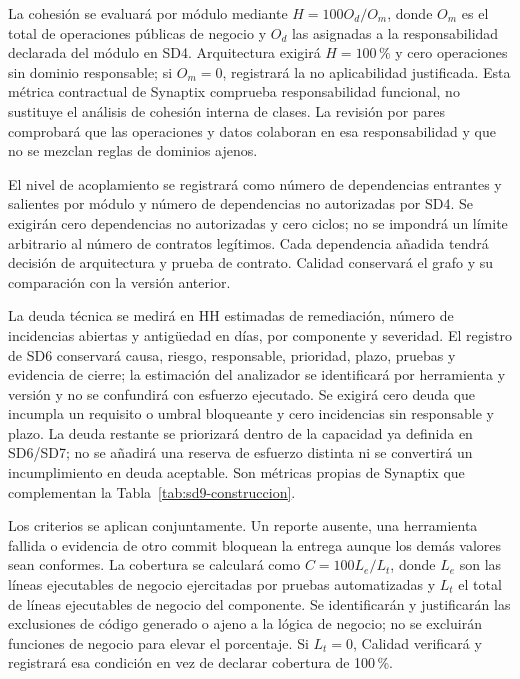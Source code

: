 La cohesión se evaluará por módulo mediante $H=100O_d/O_m$, donde $O_m$ es el total de operaciones públicas de negocio y $O_d$ las asignadas a la responsabilidad declarada del módulo en SD4. Arquitectura exigirá $H=100\,\%$ y cero operaciones sin dominio responsable; si $O_m=0$, registrará la no aplicabilidad justificada. Esta métrica contractual de Synaptix comprueba responsabilidad funcional, no sustituye el análisis de cohesión interna de clases. La revisión por pares comprobará que las operaciones y datos colaboran en esa responsabilidad y que no se mezclan reglas de dominios ajenos.

El nivel de acoplamiento se registrará como número de dependencias entrantes y salientes por módulo y número de dependencias no autorizadas por SD4. Se exigirán cero dependencias no autorizadas y cero ciclos; no se impondrá un límite arbitrario al número de contratos legítimos. Cada dependencia añadida tendrá decisión de arquitectura y prueba de contrato. Calidad conservará el grafo y su comparación con la versión anterior.

La deuda técnica se medirá en HH estimadas de remediación, número de incidencias abiertas y antigüedad en días, por componente y severidad. El registro de SD6 conservará causa, riesgo, responsable, prioridad, plazo, pruebas y evidencia de cierre; la estimación del analizador se identificará por herramienta y versión y no se confundirá con esfuerzo ejecutado. Se exigirá cero deuda que incumpla un requisito o umbral bloqueante y cero incidencias sin responsable y plazo. La deuda restante se priorizará dentro de la capacidad ya definida en SD6/SD7; no se añadirá una reserva de esfuerzo distinta ni se convertirá un incumplimiento en deuda aceptable. Son métricas propias de Synaptix que complementan la Tabla~\ref{tab:sd9-construccion}. \parencite[sec.~6.2, Arquitectura evolutiva, codificación y deuda técnica]{sd9-sd6}

Los criterios se aplican conjuntamente. Un reporte ausente, una herramienta fallida o evidencia de otro commit bloquean la entrega aunque los demás valores sean conformes. La cobertura se calculará como $C=100L_e/L_t$, donde $L_e$ son las líneas ejecutables de negocio ejercitadas por pruebas automatizadas y $L_t$ el total de líneas ejecutables de negocio del componente. Se identificarán y justificarán las exclusiones de código generado o ajeno a la lógica de negocio; no se excluirán funciones de negocio para elevar el porcentaje. Si $L_t=0$, Calidad verificará y registrará esa condición en vez de declarar cobertura de 100\,\%.

